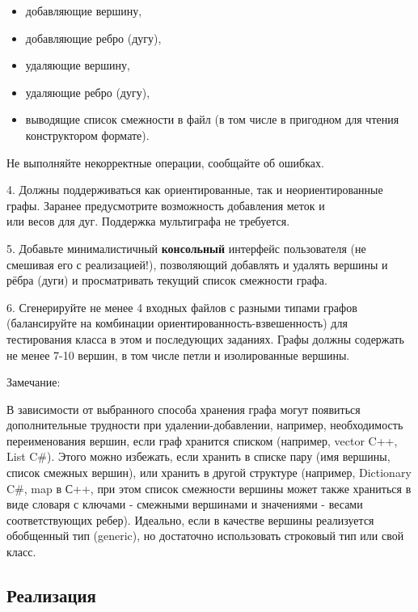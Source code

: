 \documentclass[referat]{SCWorks}
\begin{document}
    \begin{itemize}
        \item добавляющие вершину,

        \item добавляющие ребро (дугу),

        \item удаляющие вершину,

        \item удаляющие ребро (дугу),
        \item выводящие список смежности в файл (в том числе в пригодном для чтения конструктором формате).
    \end{itemize}
    Не выполняйте некорректные операции, сообщайте об ошибках.


    4. Должны поддерживаться как ориентированные, так и неориентированные графы.
    Заранее предусмотрите возможность добавления меток и\\или весов для дуг.
    Поддержка мультиграфа не требуется.

    5. Добавьте минималистичный \textbf{консольный} интерфейс пользователя (не смешивая его с реализацией!), позволяющий добавлять и удалять вершины и рёбра (дуги) и просматривать текущий список смежности графа.

    6. Сгенерируйте не менее 4 входных файлов с разными типами графов (балансируйте на комбинации ориентированность-взвешенность) для тестирования класса в этом и последующих заданиях. Графы должны содержать не менее 7-10 вершин, в том числе петли и изолированные вершины.


    Замечание:

    В зависимости от выбранного способа хранения графа могут появиться дополнительные трудности при удалении-добавлении, например, необходимость переименования вершин, если граф хранится списком (например, vector C++, List C#). Этого можно избежать, если хранить в списке пару (имя вершины, список смежных вершин), или хранить в другой структуре (например, Dictionary C#, map в С++, при этом список смежности вершины может также храниться в виде словаря с ключами - смежными вершинами и значениями - весами соответствующих ребер). Идеально, если в качестве вершины реализуется обобщенный тип (generic), но достаточно использовать строковый тип или свой класс.


    \subsection{Реализация}
\end{document}
